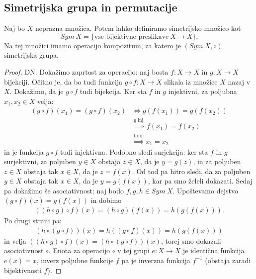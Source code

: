 \documentclass[10pt, a4paper]{article}
\newenvironment{noticeC}{%
  \tcolorbox[%
  notitle,
  empty,
  enhanced,  %
  breakable,
  coltext=black, 
  fontupper=\rmfamily,
  parbox=false,
  noparskip,
  sharp corners,
  boxrule=-1pt,  %
  frame hidden,
  left=7pt,  %
  right=7pt,
  top=5pt,
  bottom=5pt,
  before skip=2.5ex plus 2pt,
  after skip=2.5ex plus 2pt,
  overlay unbroken and last={%
  },
  ]}
{\endtcolorbox}
\newenvironment{dokaz}%
  {\begin{noticeC}\begin{proof}}%
  {\end{proof}\end{noticeC}}
\begin{document}
\subsection{Simetrijska grupa in permutacije}

Naj bo $X$ neprazna množica. Potem lahko definiramo simetrijsko množico kot
$$Sym\ X = \{\text{vse bijektivne preslikave}\ X \rightarrow X\}.$$
Na tej množici imamo operacijo kompozitum, za katero je $(Sym\ X, \circ)$ simetrijska grupa.
 
\begin{dokaz}
DN: Dokažimo zaprtost za operacijo: naj bosta $f: X \rightarrow X$ in $g: X \rightarrow X$ bijekciji. 
Očitno je, da bo tudi funkcija $g \circ f: X \rightarrow X$ slikala iz množice $X$ nazaj v $X$. Dokažimo, da je $g \circ f$ tudi bijekcija.
Ker sta $f$ in $g$ injektivni, za poljubna $x_1, x_2 \in X$ velja:
        \begin{align*}
            (g \circ f) (x_1) = (g \circ f)(x_2) &\iff g(f(x_1)) = g(f(x_2))\\
            &\stackrel{\text{g inj.}}{\implies} f(x_1) = f(x_2)\\
            &\stackrel{\text{f inj.}}{\implies} x_1 = x_2
        \end{align*} in je funkcija $g \circ f$ tudi injektivna.
Podobno sledi surjekcija: ker sta $f$ in $g$ surjektivni, za poljuben $y \in X$ obstaja $z \in X$, 
da je $y = g(z)$, in za poljuben $z \in X$ obstaja tak $x \in X$, da je $z = f(x)$.
Od tod pa hitro sledi, da za poljuben $y \in X$ obstaja tak $x \in X$, da je $y = g(f(x))$, kar pa smo želeli dokazati.
Sedaj pa dokažimo še asociativnost: naj bodo $f,g,h \in Sym\ X$. 
    Upoštevamo dejstvo $(g \circ f)(x) = g(f(x))$ in dobimo
    \begin{align*}
        ((h \circ g) \circ f)(x) = (h \circ g)(f(x))
        = h(g(f(x))).
    \end{align*}
    Po drugi strani pa:
    \begin{align*}
        (h \circ (g \circ f))(x) = h((g \circ f)(x))
        = h(g(f(x)))
    \end{align*}
    in velja $((h \circ g) \circ f)(x) = (h \circ (g \circ f))(x)$, torej smo dokazali asociativnost $\circ$.
    Enota za operacijo $\circ$ v tej grupi $e: X \rightarrow X$ je identična funkcija $e(x) = x$,
    inverz poljubne funkcije $f$ pa je inverzna funkcija $f^{-1}$ (obstaja zaradi bijektivnosti $f$).
\end{dokaz}
\end{document}
